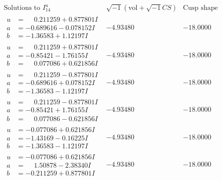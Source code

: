 \documentclass[1p]{elsarticle_modified}
\theoremstyle{definition}
\newcommand{\I}{\sqrt{-1}}
\begin{document}
$$\begin{array}{c|c|c}  
\text{Solutions to }I^u_{14}& \I (\text{vol} + \sqrt{-1}CS) & \text{Cusp shape}\\
 \hline 
\begin{aligned}
u &= \phantom{-}0.211259 + 0.877801 I \\
a &= -0.689616 - 0.078152 I \\
b &= -1.36583 + 1.12197 I\end{aligned}
 & -4.93480\phantom{ +0.000000I} & -18.0000\phantom{ +0.000000I} \\ \hline\begin{aligned}
u &= \phantom{-}0.211259 + 0.877801 I \\
a &= -0.85421 - 1.76155 I \\
b &= \phantom{-}0.077086 + 0.621856 I\end{aligned}
 & -4.93480\phantom{ +0.000000I} & -18.0000\phantom{ +0.000000I} \\ \hline\begin{aligned}
u &= \phantom{-}0.211259 - 0.877801 I \\
a &= -0.689616 + 0.078152 I \\
b &= -1.36583 - 1.12197 I\end{aligned}
 & -4.93480\phantom{ +0.000000I} & -18.0000\phantom{ +0.000000I} \\ \hline\begin{aligned}
u &= \phantom{-}0.211259 - 0.877801 I \\
a &= -0.85421 + 1.76155 I \\
b &= \phantom{-}0.077086 - 0.621856 I\end{aligned}
 & -4.93480\phantom{ +0.000000I} & -18.0000\phantom{ +0.000000I} \\ \hline\begin{aligned}
u &= -0.077086 + 0.621856 I \\
a &= -1.43169 - 0.16225 I \\
b &= -1.36583 - 1.12197 I\end{aligned}
 & -4.93480\phantom{ +0.000000I} & -18.0000\phantom{ +0.000000I} \\ \hline\begin{aligned}
u &= -0.077086 + 0.621856 I \\
a &= \phantom{-}1.50878 - 2.38340 I \\
b &= -0.211259 + 0.877801 I\end{aligned}
 & -4.93480\phantom{ +0.000000I} & -18.0000\phantom{ +0.000000I} \\ \hline\begin{aligned}

\end{aligned}
\end{array}$$
\end{document}
